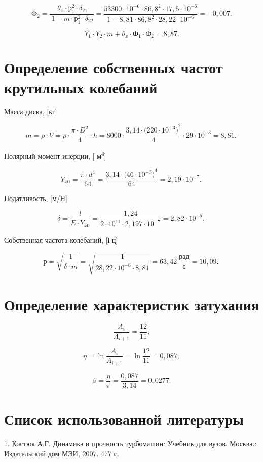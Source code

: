 \[Ф_{2} = \frac{\ \theta_{x}\cdot р_{1}^{2}\cdot\delta_{21}}{\ 1 - m\cdot р_{1}^{2}\cdot\delta_{22}} = \frac{53300\cdot10^{- 6}\cdot{86,8}^{2}\cdot17,5\cdot10^{- 6}}{1 - 8,81\cdot{86,8}^{2}\cdot28,22\cdot10^{- 6}} = -0,007.\]

\[Y_{1}\cdot Y_{2}\cdot m + \theta_{x}\cdot Ф_{1}\cdot Ф_{2} = 8,87.\]

\section{Определение собственных частот крутильных колебаний}

Масса диска, [кг]

\[m = \rho\cdot V = \rho\cdot\frac{\pi\cdot D^{2}}{4}\cdot h = 8000\cdot\frac{3,14\cdot({220\cdot10^{- 3})}^{2}}{4}\cdot29\cdot10^{- 3} = 8,81.\ \]

Полярный момент инерции, [ м\textsuperscript{4}]

\[Y_{x0} = \frac{\pi\cdot d^{4}}{64} = \frac{3,14\cdot({46\cdot10^{- 3})}^{4}}{64} = 2,19\cdot10^{-7}.\ \]

Податливость, [м/Н]

\[\delta = \frac{l}{E\cdot Y_{x0}} = \frac{1,24}{2\cdot10^{11}\cdot2,197\cdot10^{- 7}} = 2,82\cdot10^{-5}.\ \]

Собственная частота колебаний, [Гц]

\[р = \sqrt{\frac{1}{\delta\cdot \textit{m}}} = \sqrt{\frac{1}{28,22\cdot10^{- 6}\cdot8,81}} = 63,42\ \frac{рад}{с} = 10,09.\ \]

\section{Определение характеристик затухания}

\[\frac{A_{i}}{A_{i + 1}} = \frac{12}{11};\]

\[\eta = \ln\frac{A_{i}}{A_{i + 1}} = \ln\frac{12}{11} = 0,087;\]

\[\beta = \frac{\eta}{\pi} = \frac{0,087}{3,14} = 0,0277.\]

\section{Список использованной литературы}

1. Костюк А.Г. Динамика и прочность турбомашин: Учебник для вузов.  Москва.: Издательский дом МЭИ, 2007. 477 с.


